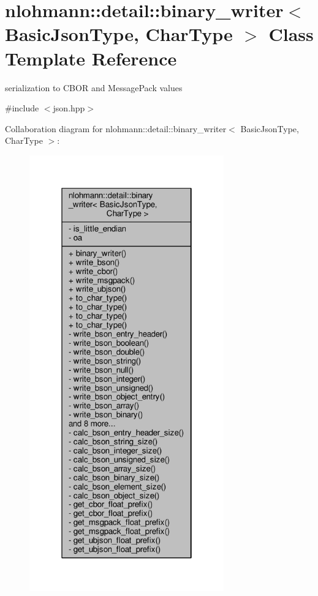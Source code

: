 \hypertarget{classnlohmann_1_1detail_1_1binary__writer}{}\section{nlohmann\+:\+:detail\+:\+:binary\+\_\+writer$<$ Basic\+Json\+Type, Char\+Type $>$ Class Template Reference}
\label{classnlohmann_1_1detail_1_1binary__writer}


serialization to C\+B\+OR and Message\+Pack values  




{\ttfamily \#include $<$json.\+hpp$>$}



Collaboration diagram for nlohmann\+:\+:detail\+:\+:binary\+\_\+writer$<$ Basic\+Json\+Type, Char\+Type $>$\+:
\nopagebreak
\begin{figure}[H]
\begin{center}
\leavevmode
\includegraphics[width=238pt]{classnlohmann_1_1detail_1_1binary__writer__coll__graph}
\end{center}
\end{figure}
